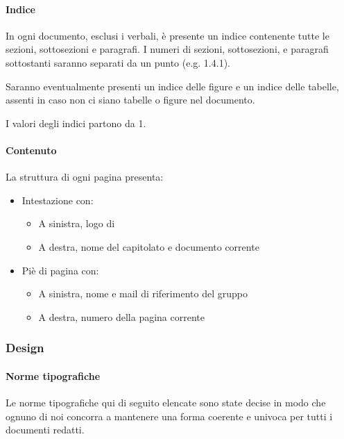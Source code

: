 			\paragraph{Indice}\label{PS:Documentazione:Struttura:Indice}
			In ogni documento, esclusi i verbali, è presente un indice contenente tutte le sezioni, sottosezioni e paragrafi. I numeri di sezioni, sottosezioni,
			e paragrafi sottostanti saranno separati da un punto (e.g. 1.4.1).\par
			Saranno eventualmente presenti un indice delle
			figure e un indice delle tabelle, assenti in caso non ci siano tabelle o figure nel documento.\par
			I valori degli indici partono da 1.

			\paragraph{Contenuto}\label{PS:Documentazione:Struttura:Contenuto}
			La struttura di ogni pagina presenta:
			\begin{itemize}
				\item Intestazione con:
				\begin{itemize}
					\item A sinistra, logo di \gruppo
					\item A destra, nome del capitolato e documento corrente
				\end{itemize}
				\item Piè di pagina con:
				\begin{itemize}
					\item A sinistra, nome e mail di riferimento del gruppo
					\item A destra, numero della pagina corrente
				\end{itemize}
			\end{itemize}


		\subsubsection{Design}\label{PS:Documentazione:Design}

			\paragraph{Norme tipografiche}\label{PS:Documentazione:Design:NormeT}
			Le norme tipografiche qui di seguito elencate sono state decise in modo che ognuno di noi concorra a mantenere una forma coerente e univoca
			per tutti i documenti redatti.


